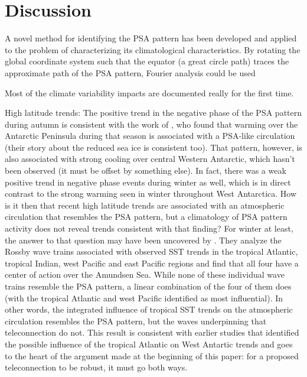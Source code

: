 \section{Discussion}

A novel method for identifying the PSA pattern has been developed and applied to the problem of characterizing its climatological characteristics. By rotating the global coordinate system such that the equator (a great circle path) traces the approximate path of the PSA pattern, Fourier analysis could be used   

Most of the climate variability impacts are documented really for the first time.

High latitude trends: The positive trend in the negative phase of the PSA pattern during autumn is consistent with the work of \citet{Ding2013}, who found that warming over the Antarctic Peninsula during that season is associated with a PSA-like circulation (their story about the reduced sea ice is consistent too). That pattern, however, is also associated with strong cooling over central Western Antarctic, which hasn't been observed (it must be offset by something else). In fact, there was a weak positive trend in negative phase events during winter as well, which is in direct contrast to the strong warming seen in winter throughout West Antarctica. How is it then that recent high latitude trends are associated with an atmospheric circulation that resembles the PSA pattern, but a climatology of PSA pattern activity does not reveal trends consistent with that finding? For winter at least, the answer to that question may have been uncovered by \citet{Li2015a}. They analyze the Rossby wave trains associated with observed SST trends in the tropical Atlantic, tropical Indian, west Pacific and east Pacific regions and find that all four have a center of action over the Amundsen Sea. While none of these individual wave trains resemble the PSA pattern, a linear combination of the four of them does (with the tropical Atlantic and west Pacific identified as most influential). In other words, the integrated influence of tropical SST trends on the atmospheric circulation resembles the PSA pattern, but the waves underpinning that teleconnection do not. This result is consistent with earlier studies that identified the possible influence of the tropical Atlantic on West Antartic trends \citep{Li2014,Simpkins2014} and goes to the heart of the argument made at the beginning of this paper: for a proposed teleconnection to be robust, it must go both ways. 

